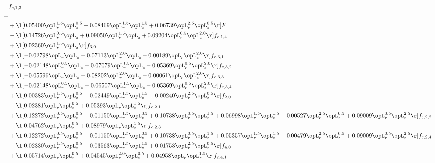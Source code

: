 \begin{alignat}{2} 
\label{eq:f_13_2} 
& f_{c,1,3} \nonumber \\ 
 = \\ 
& + \l[  0.05400 \opL_r^{1.5} \opL_z^{0.5} +  0.08469 \opL_r^{1.5} \opL_z^{1.5} +  0.06739 \opL_r^{2.5} \opL_z^{0.5}  \r] F \nonumber \\ 
& - \l[  0.14726 \opL_r^{0.5} \opL_z +  0.09050 \opL_r^{1.5} \opL_z +  0.09204 \opL_r^{0.5} \opL_z^{2.0}  \r] f_{c,1,4} \nonumber \\ 
& + \l[  0.02360 \opL_r^{1.5} \opL_z  \r] f_{3,0} \nonumber \\ 
& + \l[  -0.02798 \opL_r \opL_z   -0.07113 \opL_r^{2.0} \opL_z +  0.00189 \opL_r \opL_z^{2.0}  \r] f_{c,3,1} \nonumber \\ 
& + \l[  -0.02148 \opL_r^{0.5} \opL_z +  0.07079 \opL_r^{1.5} \opL_z   -0.05369 \opL_r^{0.5} \opL_z^{2.0}  \r] f_{c,3,2} \nonumber \\ 
& + \l[  -0.05596 \opL_r \opL_z   -0.08202 \opL_r^{2.0} \opL_z +  0.00061 \opL_r \opL_z^{2.0}  \r] f_{c,3,3} \nonumber \\ 
& + \l[  -0.02148 \opL_r^{0.5} \opL_z +  0.06507 \opL_r^{1.5} \opL_z   -0.05369 \opL_r^{0.5} \opL_z^{2.0}  \r] f_{c,3,4} \nonumber \\ 
& + \l[  0.00383 \opL_r^{1.5} \opL_z^{0.5} +  0.02449 \opL_r^{1.5} \opL_z^{1.5}   -0.00240 \opL_r^{2.5} \opL_z^{0.5}  \r] f_{2,0} \nonumber \\ 
& - \l[  0.02381 \opL_r \opL_z^{0.5} +  0.05393 \opL_r \opL_z^{1.5}  \r] f_{c,2,1} \nonumber \\ 
& + \l[  0.12272 \opL_r^{0.5} \opL_z^{0.5} +  0.01150 \opL_r^{1.5} \opL_z^{0.5} +  0.10738 \opL_r^{0.5} \opL_z^{1.5} +  0.06998 \opL_r^{1.5} \opL_z^{1.5}   -0.00527 \opL_r^{2.5} \opL_z^{0.5} +  0.09009 \opL_r^{0.5} \opL_z^{2.5}  \r] f_{c,2,2} \nonumber \\ 
& - \l[  0.04762 \opL_r \opL_z^{0.5} +  0.08979 \opL_r \opL_z^{1.5}  \r] f_{c,2,3} \nonumber \\ 
& + \l[  0.12272 \opL_r^{0.5} \opL_z^{0.5} +  0.01150 \opL_r^{1.5} \opL_z^{0.5} +  0.10738 \opL_r^{0.5} \opL_z^{1.5} +  0.05357 \opL_r^{1.5} \opL_z^{1.5}   -0.00479 \opL_r^{2.5} \opL_z^{0.5} +  0.09009 \opL_r^{0.5} \opL_z^{2.5}  \r] f_{c,2,4} \nonumber \\ 
& - \l[  0.02330 \opL_r^{1.5} \opL_z^{0.5} +  0.03563 \opL_r^{1.5} \opL_z^{1.5} +  0.01753 \opL_r^{2.5} \opL_z^{0.5}  \r] f_{4,0} \nonumber \\ 
& + \l[  0.05714 \opL_r \opL_z^{0.5} +  0.04545 \opL_r^{2.0} \opL_z^{0.5} +  0.04958 \opL_r \opL_z^{1.5}  \r] f_{c,4,1} \nonumber \\ 

\end{alignat}

